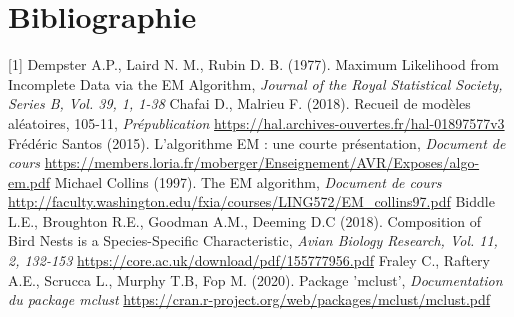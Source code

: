 \documentclass[frenchb]{report}
\newcommand{\1}{\mathbbm{1}}
\theoremstyle{definition}\newtheorem{defn}{Définition}
\theoremstyle{definition}\newtheorem{exm}{Exemple}
\theoremstyle{definition}\newtheorem{nota}{Notation}
\theoremstyle{definition}\newtheorem{rem}{Remarque}
\begin{document}
\chapter*{Bibliographie}
 
[1] Dempster A.P., Laird N. M., Rubin D. B. (1977). Maximum Likelihood from Incomplete Data via the EM Algorithm, \textit{Journal of the Royal Statistical Society, Series B, Vol. 39, 1, 1-38}\newline
\break
[2] Chafai D., Malrieu F. (2018). Recueil de modèles aléatoires, 105-11, \textit{Prépublication}\newline
\url{https://hal.archives-ouvertes.fr/hal-01897577v3}\newline
\break
[3] Frédéric Santos (2015). L’algorithme EM : une courte présentation, \textit{Document de cours}
\newline\url{https://members.loria.fr/moberger/Enseignement/AVR/Exposes/algo-em.pdf} \newline
\break
[4] Michael Collins (1997). The EM algorithm, \textit{Document de cours}\newline
\url{http://faculty.washington.edu/fxia/courses/LING572/EM_collins97.pdf} \newline
\break
[5] Biddle L.E., Broughton R.E., Goodman A.M., Deeming D.C (2018). Composition of Bird Nests is a Species-Specific Characteristic, \textit{Avian Biology Research, Vol. 11, 2, 132-153}\newline
\url{https://core.ac.uk/download/pdf/155777956.pdf}\newline %
\break
[6] Fraley C., Raftery A.E., Scrucca L., Murphy T.B, Fop M. (2020). Package 'mclust', \textit{Documentation du package mclust}\newline
 \url{https://cran.r-project.org/web/packages/mclust/mclust.pdf} 



\pagebreak
\end{document}
